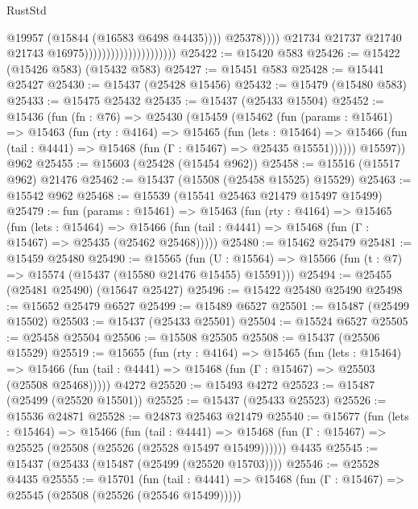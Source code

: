 \begin{lexlean}{RustStd}
\begin{coremodule}
                                                          @19957
                                                          (@15844 (@16583 @6498 @4435))))
                                                      @25378))))
                                              @21734
                                              @21737
                                              @21740
                                              @21743
                                              @16975)))))))))))))))))))))
@25422 := @15420 @583
@25426 := @15422 (@15426 @583) (@15432 @583)
@25427 := @15451 @583
@25428 := @15441 @25427
@25430 := @15437 (@25428 @15456)
@25432 := @15479 (@15480 @583)
@25433 := @15475 @25432
@25435 := @15437 (@25433 @15504)
@25452 := @15436
    (fun (fn : @76) =>
    @25430
      (@15459
        (@15462
          (fun (params : @15461) =>
          @15463
            (fun (rty : @4164) =>
            @15465
              (fun (lets : @15464) =>
              @15466 (fun (tail : @4441) => @15468 (fun (Γ : @15467) => @25435 @15551))))))
        @15597))
    @962
@25455 := @15603 (@25428 (@15454 @962))
@25458 := @15516 (@15517 @962) @21476
@25462 := @15437 (@15508 (@25458 @15525) @15529)
@25463 := @15542 @962
@25468 := @15539 (@15541 @25463 @21479 @15497 @15499)
@25479 := fun (params : @15461) =>
  @15463
    (fun (rty : @4164) =>
    @15465
      (fun (lets : @15464) =>
      @15466 (fun (tail : @4441) => @15468 (fun (Γ : @15467) => @25435 (@25462 @25468)))))
@25480 := @15462 @25479
@25481 := @15459 @25480
@25490 := @15565
    (fun (U : @15564) => @15566 (fun (t : @7) => @15574 (@15437 (@15580 @21476 @15455) @15591)))
@25494 := @25455 (@25481 @25490) (@15647 @25427)
@25496 := @15422 @25480 @25490
@25498 := @15652 @25479 @6527
@25499 := @15489 @6527
@25501 := @15487 (@25499 @15502)
@25503 := @15437 (@25433 @25501)
@25504 := @15524 @6527
@25505 := @25458 @25504
@25506 := @15508 @25505
@25508 := @15437 (@25506 @15529)
@25519 := @15655
    (fun (rty : @4164) =>
    @15465
      (fun (lets : @15464) =>
      @15466 (fun (tail : @4441) => @15468 (fun (Γ : @15467) => @25503 (@25508 @25468)))))
    @4272
@25520 := @15493 @4272
@25523 := @15487 (@25499 (@25520 @15501))
@25525 := @15437 (@25433 @25523)
@25526 := @15536 @24871
@25528 := @24873 @25463 @21479
@25540 := @15677
    (fun (lets : @15464) =>
    @15466
      (fun (tail : @4441) =>
      @15468 (fun (Γ : @15467) => @25525 (@25508 (@25526 (@25528 @15497 @15499))))))
    @4435
@25545 := @15437 (@25433 (@15487 (@25499 (@25520 @15703))))
@25546 := @25528 @4435
@25555 := @15701
    (fun (tail : @4441) => @15468 (fun (Γ : @15467) => @25545 (@25508 (@25526 (@25546 @15499)))))

\end{coremodule}
\end{lexlean}
